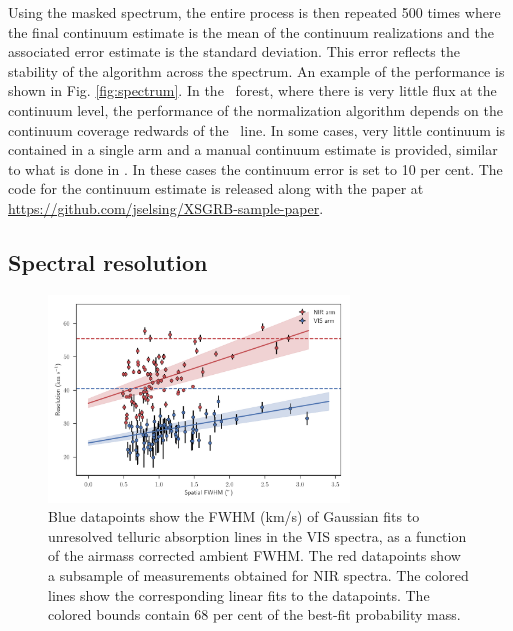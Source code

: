 \documentclass{aa}    %
\begin{document}
Using the masked spectrum, the entire process is then repeated 500 times where
the final continuum estimate is the mean of the continuum realizations and the
associated error estimate is the standard deviation. This error reflects the
stability of the algorithm across the spectrum. An example of the performance is
shown in Fig. \ref{fig:spectrum}. In the \lya~forest, where there is very little
flux at the continuum level, the performance of the normalization algorithm
depends on the continuum coverage redwards of the \lya~line. In some cases, very
little continuum is contained in a single arm and a manual continuum estimate is
provided, similar to what is done in \citet{Lopez2016}. In these cases the
continuum error is set to 10 per cent. The code for the continuum estimate is
released along with the paper at
\url{https://github.com/jselsing/XSGRB-sample-paper}.
                                                                                           
\subsection{Spectral resolution} \label{resolution}




\begin{figure}[!ht]
	\centerline{\includegraphics[width=8cm]{figures/resolutions}} \caption{Blue
	datapoints show the FWHM (km/s) of Gaussian fits to unresolved telluric
	absorption lines in the VIS spectra, as a function of the airmass corrected
	ambient FWHM. The red datapoints show a subsample of measurements obtained for
	NIR spectra. The colored lines show the corresponding linear fits to the
	datapoints. The colored bounds contain 68 per cent of the best-fit probability
	mass. } \label{fig:res}
\end{figure}
\end{document}

